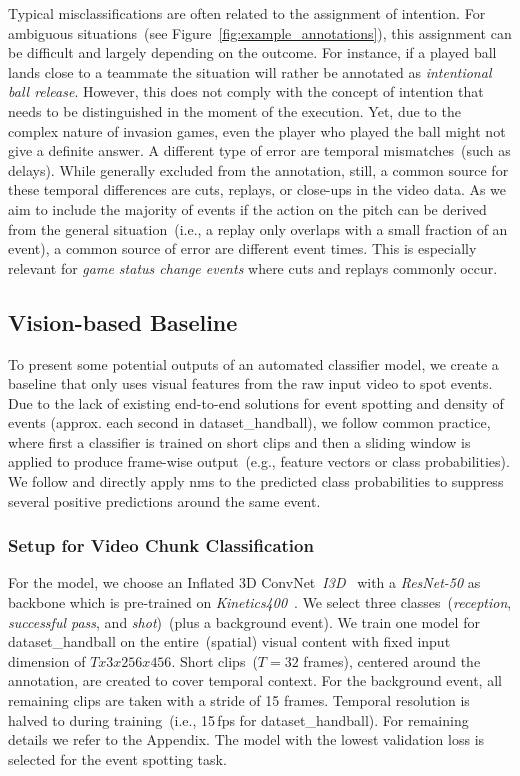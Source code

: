 Typical misclassifications are often related to the assignment of intention. For ambiguous situations~(see Figure~\ref{fig:example_annotations}), this assignment can be difficult and largely depending on the outcome. For instance, if a played ball lands close to a teammate the situation will rather be annotated as \textit{intentional ball release}. However, this does not comply with the concept of intention that needs to be distinguished in the moment of the execution. Yet, due to the complex nature of invasion games, even the player who played the ball might not give a definite answer.          
A different type of error are temporal mismatches~(such as delays). While generally excluded from the annotation, still, a common source for these temporal differences are cuts, replays, or close-ups in the video data. As we aim to include the majority of events
if the action on the pitch can be derived from the general situation~(i.e., a replay only overlaps with a small fraction of an event), a common source of error are different event times. This is especially relevant for \textit{game status change events} where cuts and replays commonly occur.

\subsection{Vision-based Baseline}\label{exp:baseline}
To present some potential outputs of an automated classifier model, we create a baseline that only uses visual features from the raw input video to spot events.
Due to the lack of existing end-to-end solutions for event spotting and density of events (approx. each second in \acrshort{dataset_handball}), we follow common practice, where first a classifier is trained on short clips and then a sliding window is applied to produce frame-wise output~(e.g., feature vectors or class probabilities). 
We follow \cite{sanford2020group} and directly apply \acrshort{nms} to the predicted class probabilities to suppress several positive predictions around the same event.

\subsubsection{Setup for Video Chunk Classification}
For the model, we choose an Inflated 3D ConvNet~\emph{I3D}~\cite{carreira2017quo, NonLocal2018} with a \emph{ResNet-50} as backbone which is pre-trained on \emph{Kinetics400}~\cite{kay2017kinetics}. 
We select three classes~(\emph{reception}, \emph{successful pass}, and \emph{shot})~(plus a background event). We train one model for \acrshort{dataset_handball} on the entire~(spatial) visual content with fixed input dimension of $Tx3x256x456$.
Short clips~($T=32$ frames), centered around the annotation, are created to cover temporal context. For the background event, all remaining clips are taken with a stride of 15 frames. 
Temporal resolution is halved to during training~(i.e., 15\,fps for \acrshort{dataset_handball}).
For remaining details we refer to the Appendix.
The model with the lowest validation loss is selected for the event spotting task.


